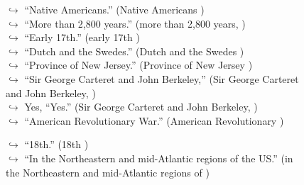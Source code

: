 \documentclass[11pt,a4paper, onecolumn]{article}
\begin{document}
\begin{figure}[t] \small \begin{tcolorbox}[boxsep=0pt,left=5pt,right=0pt,top=2pt,colback = yellow!5] \begin{dialogue}
 \small 
\colorbox{pink!25}{$\hookrightarrow$}
{ ``Native Americans.'' (Native Americans ) }
\\
\colorbox{pink!25}{$\hookrightarrow$}
{ ``More than 2,800 years.'' (more than 2,800 years, ) }
\\
\colorbox{pink!25}{$\hookrightarrow$}
{ ``Early 17th.'' (early 17th ) }
\\
\colorbox{pink!25}{$\hookrightarrow$}
{ ``Dutch and the Swedes.'' (Dutch and the Swedes ) }
\\
\colorbox{pink!25}{$\hookrightarrow$}
{ ``Province of New Jersey.'' (Province of New Jersey ) }
\\
\colorbox{pink!25}{$\hookrightarrow$}
{ ``Sir George Carteret and John Berkeley,'' (Sir George Carteret and John Berkeley, ) }
\\
\colorbox{pink!25}{$\hookrightarrow$}
\colorbox{red!25}{Yes,}
{ ``Yes.'' (Sir George Carteret and John Berkeley, ) }
\\
\colorbox{pink!25}{$\hookrightarrow$}
{ ``American Revolutionary War.'' (American Revolutionary ) }
 \end{dialogue}\end{tcolorbox}\end{figure}\begin{figure}[t] \small \begin{tcolorbox}[boxsep=0pt,left=5pt,right=0pt,top=2pt,colback = yellow!5] \begin{dialogue}
 \small 
\colorbox{pink!25}{$\hookrightarrow$}
{ ``18th.'' (18th ) }
\\
\colorbox{pink!25}{$\hookrightarrow$}
{ ``In the Northeastern and mid-Atlantic regions of the US.'' (in the Northeastern and mid-Atlantic regions of ) }
\\

\end{dialogue}
\end{tcolorbox}
\end{figure}
\end{document}
